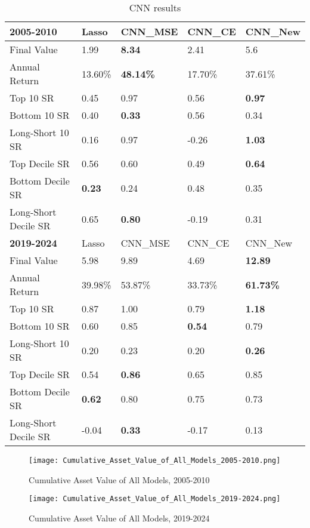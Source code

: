 \documentclass[preprint,12pt,numafflabel,authoryear]{elsarticle}
\begin{document}
\begin{table}[htp]
\centering
\begin{tabular}{ P{3cm} P{2cm} P{2cm} P{2cm} P{2cm}}
\toprule
\textbf{2005-2010} & Lasso & CNN\_MSE & CNN\_CE & CNN\_New \\
\hline
Final Value & 1.99 & \textbf{8.34} & 2.41 & 5.6 \\
Annual Return & 13.60\% & \textbf{48.14\%} & 17.70\% & 37.61\% \\
Top 10 SR & 0.45 & 0.97 & 0.56 & \textbf{0.97} \\
Bottom 10 SR & 0.40 & \textbf{0.33} & 0.56 & 0.34 \\
Long-Short 10 SR & 0.16 & 0.97 & -0.26 & \textbf{1.03} \\
\toprule
Top Decile SR & 0.56 & 0.60 & 0.49 & \textbf{0.64} \\
Bottom Decile SR & \textbf{0.23} & 0.24 & 0.48 & 0.35 \\
Long-Short Decile SR & 0.65 & \textbf{0.80} & -0.19 & 0.31 \\
\hhline{=====}
\textbf{2019-2024} & Lasso & CNN\_MSE & CNN\_CE & CNN\_New \\
\hline
Final Value & 5.98 & 9.89 & 4.69 & \textbf{12.89} \\
Annual Return & 39.98\% & 53.87\% & 33.73\% & \textbf{61.73\%} \\
Top 10 SR & 0.87 & 1.00 & 0.79 & \textbf{1.18} \\
Bottom 10 SR & 0.60 & 0.85 & \textbf{0.54} & 0.79 \\
Long-Short 10 SR & 0.20 & 0.23 & 0.20 & \textbf{0.26} \\
\toprule
Top Decile SR & 0.54 & \textbf{0.86} & 0.65 & 0.85 \\
Bottom Decile SR & \textbf{0.62} & 0.80 & 0.75 & 0.73 \\
Long-Short Decile SR & -0.04 & \textbf{0.33} & -0.17 & 0.13 \\
\bottomrule
\end{tabular}
\caption{CNN results}
\label{tab:CNN results}
\end{table}

\begin{figure}[htp]
\centering
\texttt{[image: Cumulative\_Asset\_Value\_of\_All\_Models\_2005-2010.png]}
\caption{Cumulative Asset Value of All Models, 2005-2010}
\label{fig:total asset simulation 06-10}
\end{figure}

\begin{figure}[htp]
\centering
\texttt{[image: Cumulative\_Asset\_Value\_of\_All\_Models\_2019-2024.png]}
\caption{Cumulative Asset Value of All Models, 2019-2024}
\label{fig:total asset simulation 19-24}
\end{figure}
\end{document}
